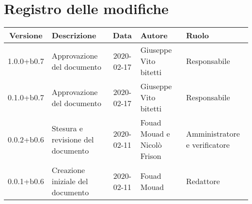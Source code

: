 \section*{Registro delle modifiche}

\begin{center}
	\begin{longtable}{|c|p{3.5cm}|c|p{3cm}|p{3cm}|}
	\hline
	\rowcolor{lighter-grayer}
	\textbf{Versione} & \textbf{Descrizione} & \textbf{Data} & \textbf{Autore} & \textbf{Ruolo} \\
	\hline
	\endfirsthead


	1.0.0+b0.7 & Approvazione del documento & 2020-02-17 & Giuseppe Vito bitetti & Responsabile \\
	\hline
	0.1.0+b0.7 & Approvazione del documento & 2020-02-17 & Giuseppe Vito bitetti & Responsabile \\
	\hline
	0.0.2+b0.6 & Stesura e revisione del documento & 2020-02-11 & Fouad Mouad e Nicolò Frison & Amministratore e verificatore \\
	\hline
	0.0.1+b0.6 & Creazione iniziale del documento & 2020-02-11 & Fouad Mouad & Redattore \\
	\hline

	\end{longtable}
\end{center}